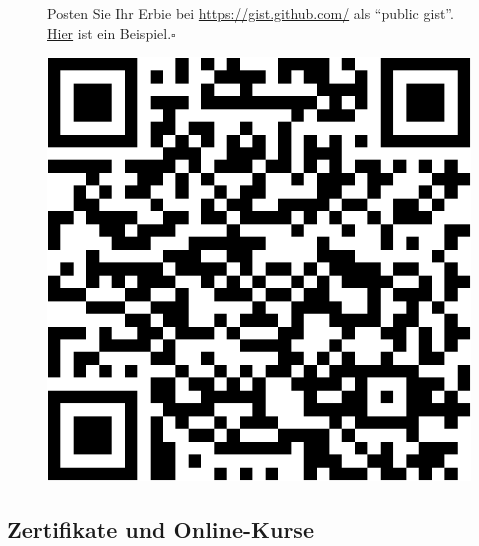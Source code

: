 \documentclass[
  letterpaper,
]{scrbook}
\theoremstyle{definition}
\theoremstyle{definition}
\theoremstyle{definition}
\theoremstyle{remark}
\begin{document}
\begin{tcolorbox}[enhanced jigsaw, colbacktitle=quarto-callout-tip-color!10!white, coltitle=black, bottomrule=.15mm, rightrule=.15mm, arc=.35mm, toptitle=1mm, colframe=quarto-callout-tip-color-frame, opacitybacktitle=0.6, left=2mm, leftrule=.75mm, breakable, opacityback=0, bottomtitle=1mm, titlerule=0mm, title=\textcolor{quarto-callout-tip-color}{\faLightbulb}\hspace{0.5em}{Tipp}, colback=white, toprule=.15mm]

\begin{figure}[H]

\begin{minipage}{0.80\linewidth}
Posten Sie Ihr Erbie bei \url{https://gist.github.com/} als ``public
gist''.
\href{https://gist.github.com/sebastiansauer/0649a0453b5cc7c6a1d16ac760667215}{Hier}
ist ein Beispiel.\(\square\)\end{minipage}%
%
\begin{minipage}{0.20\linewidth}

\begin{center}
\includegraphics[width=0.75\linewidth,height=\textheight,keepaspectratio]{030-aufbereiten_files/figure-pdf/unnamed-chunk-49-1.pdf}
\end{center}

\end{minipage}%

\end{figure}%

\end{tcolorbox}

\subsection{Zertifikate und
Online-Kurse}\label{zertifikate-und-online-kurse}
\end{document}
